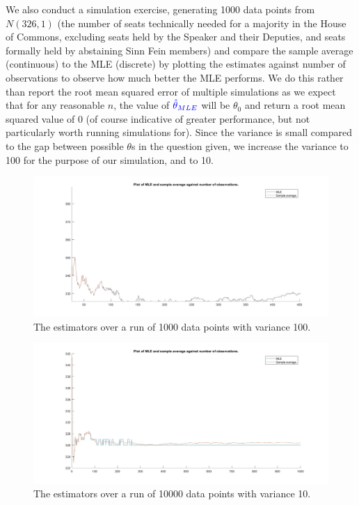 \documentclass{article}
\renewcommand{\r}[1]{\textcolor{blue}{#1}}
\begin{document}
We also conduct a simulation exercise, generating 1000 data points from $N(326,1)$ (the number of seats technically needed for a majority in the House of Commons, excluding seats held by the Speaker and their Deputies, and seats formally held by abstaining Sinn Fein members) and compare the sample average (continuous) to the MLE (discrete) by plotting the estimates against number of observations to observe how much better the MLE performs. We do this rather than report the root mean squared error of multiple simulations as we expect that for any reasonable $n$, the value of $\r{\hat{\theta}_{MLE}}$ will be $\theta_{0}$ and return a root mean squared value of 0 (of course indicative of greater performance, but not particularly worth running simulations for). Since the variance is small compared to the gap between possible $\theta$s in the question given, we increase the variance to 100 for the purpose of our simulation, and to 10. 

\begin{center}
\begin{figure}[!htb]
\centering
\includegraphics[width=13cm]{q10var100.jpg}
\caption{The estimators over a run of 1000 data points with variance 100.}
\label{fig:10v100}
\end{figure} 
\end{center}

\begin{center}
\begin{figure}[!htb]
\centering
\includegraphics[width=13cm]{q10var10.jpg}
\caption{The estimators over a run of 10000 data points with variance 10.}
\label{fig:10v10}
\end{figure} 
\end{center}
\end{document}
